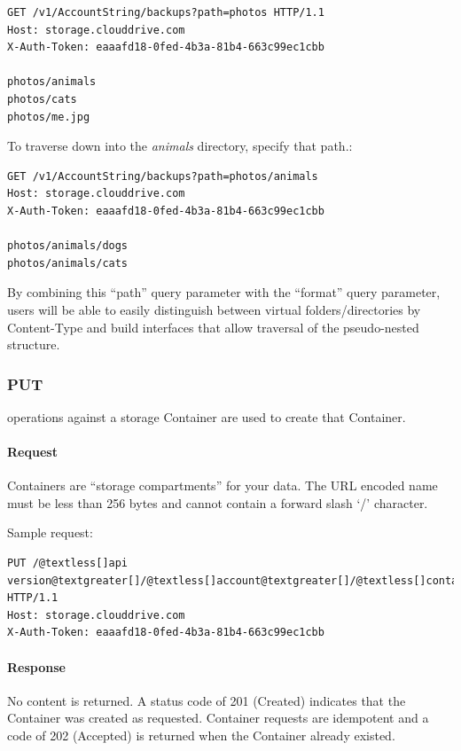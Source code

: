 \documentclass[letterpaper,10pt,english]{manual}
\begin{document}
\begin{Verbatim}[commandchars=@\[\]]
GET /v1/AccountString/backups?path=photos HTTP/1.1
Host: storage.clouddrive.com
X-Auth-Token: eaaafd18-0fed-4b3a-81b4-663c99ec1cbb

photos/animals
photos/cats
photos/me.jpg
\end{Verbatim}

To traverse down into the \emph{animals} directory, specify that path.:

\begin{Verbatim}[commandchars=@\[\]]
GET /v1/AccountString/backups?path=photos/animals
Host: storage.clouddrive.com
X-Auth-Token: eaaafd18-0fed-4b3a-81b4-663c99ec1cbb

photos/animals/dogs
photos/animals/cats
\end{Verbatim}

By combining this “path” query parameter with the “format” query
parameter, users will be able to easily distinguish between virtual
folders/directories by Content-Type and build interfaces that allow
traversal of the pseudo-nested structure.


\subsubsection{PUT}

 operations against a storage Container are used to create that
Container.


\paragraph{Request}

Containers are “storage compartments” for your data.  The URL encoded
name must be less than 256 bytes and cannot contain a forward slash
`/' character.

Sample request:

\begin{Verbatim}[commandchars=@\[\]]
PUT /@textless[]api version@textgreater[]/@textless[]account@textgreater[]/@textless[]container@textgreater[] HTTP/1.1
Host: storage.clouddrive.com
X-Auth-Token: eaaafd18-0fed-4b3a-81b4-663c99ec1cbb
\end{Verbatim}


\paragraph{Response}

No content is returned. A status code of 201 (Created) indicates that the
Container was created as requested. Container  requests are
idempotent and a code of 202 (Accepted) is returned when the Container
already existed.
\end{document}
